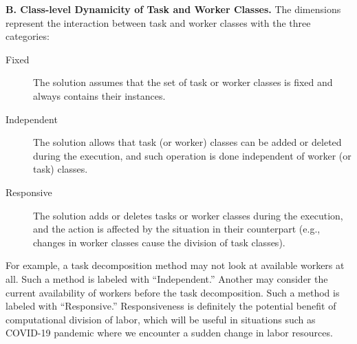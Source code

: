 
\noindent
{\bf B.  Class-level Dynamicity of Task and Worker Classes.}
The dimensions represent the interaction between task and worker classes with  the three categories:

\begin{description}
\item[Fixed] The solution assumes that the set of task or worker classes is fixed and always contains their instances.
\item[Independent] The solution allows that  task (or worker) classes can be added or deleted during the execution, and such operation is done independent of  worker (or task) classes.

\item[Responsive] The solution adds or deletes tasks or worker classes during the execution, and the action is affected by the situation in their counterpart (e.g., changes in worker classes cause the division of task classes). 

\end{description}

For example, a task decomposition method may not look at available workers  at all. Such a method is labeled with ``Independent.'' Another may consider the current availability of workers before the task decomposition. Such a method is labeled with ``Responsive.''
Responsiveness is definitely the potential benefit of computational division of labor, which will be useful in situations such as COVID-19 pandemic where we encounter a sudden change in labor resources.

